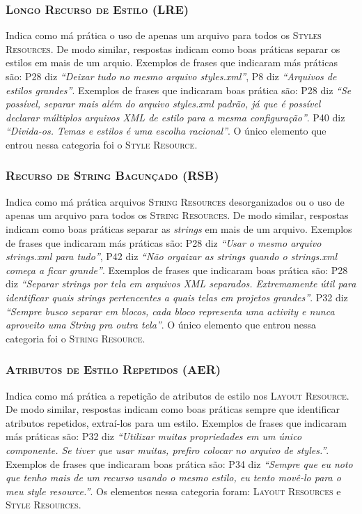 \subsubsection{\textsc{Longo Recurso de Estilo (LRE)}}
Indica como má prática o uso de apenas um arquivo para todos os \textsc{Styles Resources}. De modo similar, respostas indicam como boas práticas separar os estilos em mais de um arquio. Exemplos de frases que indicaram más práticas são: P28 diz \textit{``Deixar tudo no mesmo arquivo styles.xml''}, P8 diz \textit{``Arquivos de estilos grandes''}. Exemplos de frases que indicaram boas prática são: P28 diz \textit{``Se possível, separar mais além do arquivo styles.xml padrão, já que é possível declarar múltiplos arquivos XML de estilo para a mesma configuração''}. P40 diz \textit{``Divida-os. Temas e estilos é uma escolha racional''}. O único elemento que entrou nessa categoria foi o \textsc{Style Resource}. 

\subsubsection{\textsc{Recurso de String Bagunçado (RSB)}}
Indica como má prática arquivos \textsc{String Resources} desorganizados ou o uso de apenas um arquivo para todos os \textsc{String Resources}. De modo similar, respostas indicam como boas práticas separar as \textit{strings} em mais de um arquivo. Exemplos de frases que indicaram más práticas são: P28 diz \textit{``Usar o mesmo arquivo strings.xml para tudo''}, P42 diz \textit{``Não orgaizar as strings quando o strings.xml começa a ficar grande''}. Exemplos de frases que indicaram boas prática são: P28 diz \textit{``Separar strings por tela em arquivos XML separados. Extremamente útil para identificar quais strings pertencentes a quais telas em projetos grandes''}. P32 diz \textit{``Sempre busco separar em blocos, cada bloco representa uma activity e nunca aproveito uma String pra outra tela''}. O único elemento que entrou nessa categoria foi o \textsc{String Resource}. 

\subsubsection{\textsc{Atributos de Estilo Repetidos (AER)}}
Indica como má prática a repetição de atributos de estilo nos \textsc{Layout Resource}. De modo similar, respostas indicam como boas práticas sempre que identificar atributos repetidos, extraí-los para um estilo. Exemplos de frases que indicaram más práticas são: P32 diz \textit{``Utilizar muitas propriedades em um único componente. Se tiver que usar muitas, prefiro colocar no arquivo de styles.''}. Exemplos de frases que indicaram boas prática são: P34 diz \textit{``Sempre que eu noto que tenho mais de um recurso usando o mesmo estilo, eu tento movê-lo para o meu \textit{style resource}.''}. Os elementos nessa categoria foram: \textsc{Layout Resources} e \textsc{Style Resources}.



